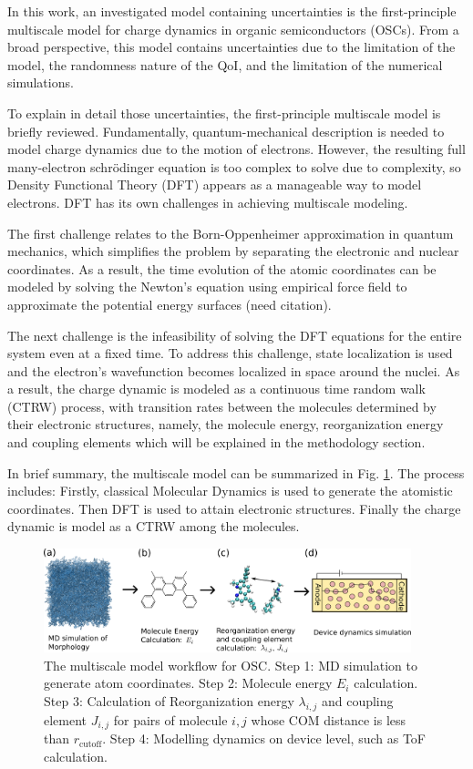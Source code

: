 \documentclass[letterpaper,12pt]{article}
\begin{document}
In this work, an investigated model containing uncertainties is the first-principle multiscale model for charge dynamics in organic semiconductors (OSCs).
From a broad perspective, this model contains uncertainties due to the limitation of the model, the randomness nature of the QoI, and the limitation of the numerical simulations.

To explain in detail those uncertainties, the first-principle multiscale model is briefly reviewed. 
Fundamentally, quantum-mechanical description is needed to model charge dynamics due to the motion of electrons. However, the resulting full many-electron schr\"{o}dinger equation is too complex to solve due to complexity, so Density Functional Theory (DFT) appears as a manageable way to model electrons.
DFT has its own challenges in achieving multiscale modeling.

The first challenge relates to the Born-Oppenheimer approximation in quantum
mechanics, which simplifies the problem by separating the electronic and nuclear
coordinates. As a result, the time evolution of the atomic coordinates can be modeled by solving the Newton's equation using empirical force field to approximate the potential energy surfaces (need citation). 

The next challenge is the infeasibility of solving the DFT equations for the entire system even at a fixed time. To address this challenge, state localization is used and the electron's wavefunction becomes localized in space around the nuclei. As a result, the charge dynamic is modeled as a continuous time random walk (CTRW) process, with transition rates between the molecules determined by their electronic structures, namely, the molecule energy, reorganization energy and coupling elements which will be explained in the methodology section. 

In brief summary, the multiscale model can be summarized in Fig. \ref{fig:MSM}.
The process includes: Firstly, classical Molecular Dynamics is used to generate the atomistic coordinates. Then DFT is used to attain electronic structures. Finally the charge dynamic is model as a CTRW among the molecules.

\begin{figure}[h]
    \centering
    \includegraphics[width=0.95\textwidth]{figs/MSM.png}
    \caption{The multiscale model workflow for OSC. Step 1: MD simulation to generate atom coordinates. Step 2: Molecule energy $E_i$ calculation. Step 3: Calculation of Reorganization energy $\lambda_{i,j}$ and coupling element $J_{i,j}$ for pairs of molecule $i,j$ whose COM distance is less than $r_\text{cutoff}$. Step 4: Modelling dynamics on device level, such as ToF calculation.}
    \label{fig:MSM}
\end{figure}
\end{document}
